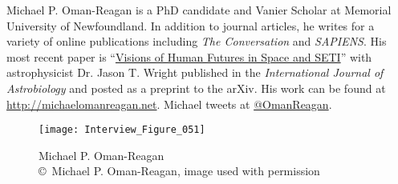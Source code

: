 Michael P. Oman-Reagan is a PhD candidate and Vanier Scholar at Memorial University of Newfoundland. In addition to journal articles, he writes for a variety of online publications including \emph{The Conversation} and \emph{SAPIENS}. His most recent paper is “\href{<https://arxiv.org/abs/1708.05318>}{Visions of Human Futures in Space and SETI}” with astrophysicist Dr. Jason T. Wright published in the \emph{International Journal of Astrobiology} and posted as a preprint to the arXiv. His work can be found at \href{<http://michaelomanreagan.net>}{http://michaelomanreagan.net}. Michael tweets at \href{<twitter.com/OmanReagan>}{@OmanReagan}.

\begin{figure}[!tb]
	\texttt{[image: Interview\_Figure\_051]}
	\centering
	\caption{Michael P. Oman-Reagan
		{\normalfont\scriptsize \\ \copyright\ Michael P. Oman-Reagan, image used with permission
	}}
	\label{Interview_Figure_051}
\end{figure}

